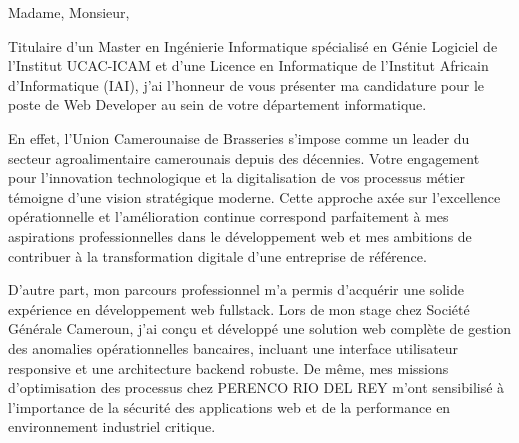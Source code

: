 \documentclass[11pt, a4paper]{../../../awesome-cv}
\begin{document}
\makecvheader[L]


\makelettertitle

\begin{cvletter}



Madame, Monsieur,

\setlength{\parindent}{2em}  %

\indent Titulaire d'un Master en Ingénierie Informatique spécialisé en Génie Logiciel de l'Institut UCAC-ICAM et d'une Licence en Informatique de l'Institut Africain d'Informatique (IAI), j'ai l'honneur de vous présenter ma candidature pour le poste de Web Developer au sein de votre département informatique.

\indent En effet, l'Union Camerounaise de Brasseries s'impose comme un leader du secteur agroalimentaire camerounais depuis des décennies. Votre engagement pour l'innovation technologique et la digitalisation de vos processus métier témoigne d'une vision stratégique moderne. Cette approche axée sur l'excellence opérationnelle et l'amélioration continue correspond parfaitement à mes aspirations professionnelles dans le développement web et mes ambitions de contribuer à la transformation digitale d'une entreprise de référence.

\indent D'autre part, mon parcours professionnel m'a permis d'acquérir une solide expérience en développement web fullstack. Lors de mon stage chez Société Générale Cameroun, j'ai conçu et développé une solution web complète de gestion des anomalies opérationnelles bancaires, incluant une interface utilisateur responsive et une architecture backend robuste. De même, mes missions d'optimisation des processus chez PERENCO RIO DEL REY m'ont sensibilisé à l'importance de la sécurité des applications web et de la performance en environnement industriel critique.


\end{cvletter}
\end{document}
